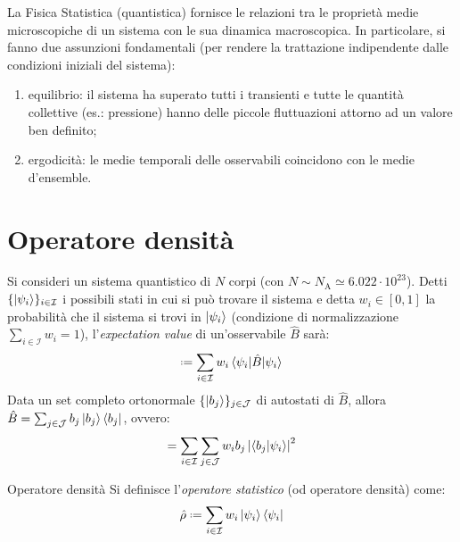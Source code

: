 
La Fisica Statistica (quantistica) fornisce le relazioni tra le proprietà medie microscopiche di un sistema con le sua dinamica macroscopica. In particolare, si fanno due assunzioni fondamentali (per rendere la trattazione indipendente dalle condizioni iniziali del sistema):
\begin{enumerate}
	\item equilibrio: il sistema ha superato tutti i transienti e tutte le quantità collettive (es.: pressione) hanno delle piccole fluttuazioni attorno ad un valore ben definito;
	\item ergodicità: le medie temporali delle osservabili coincidono con le medie d'ensemble.
\end{enumerate}

\section{Operatore densità}

Si consideri un sistema quantistico di $ N $ corpi (con $ N \sim N_\text{A} \simeq 6.022 \cdot 10^{23} $). Detti $ \{\ket{\psi_i}\}_{i \in \mathcal{I}} $ i possibili stati in cui si può trovare il sistema e detta $ w_i \in [0,1] $ la probabilità che il sistema si trovi in $ \ket{\psi_i} $ (condizione di normalizzazione $ \sum_{i \in \mathcal{I}} w_i = 1 $), l'\textit{expectation value} di un'osservabile $ \hat{B} $ sarà:
\begin{equation}
	[B] \defeq \sum_{i \in \mathcal{I}} w_i \braket{\psi_i | \hat{B} | \psi_i}
\end{equation}
Data un set completo ortonormale $ \{\ket{b_j}\}_{j \in \mathcal{J}} $ di autostati di $ \hat{B} $, allora $ \hat{B} = \sum_{j \in \mathcal{J}} b_j \ket{b_j}\bra{b_j} $, ovvero:
\begin{equation}
	[B] = \sum_{i \in \mathcal{I}} \sum_{j \in \mathcal{J}} w_i b_j \abs{\braket{b_j | \psi_i}}^2
	\label{eq:b-exp-val}
\end{equation}

\begin{definition}{Operatore densità}{}
	Si definisce l'\textit{operatore statistico} (od operatore densità) come:
	\begin{equation}
		\hat{\rho} \defeq \sum_{i \in \mathcal{I}} w_i \ket{\psi_i}\bra{\psi_i}
	\end{equation}
\end{definition}

